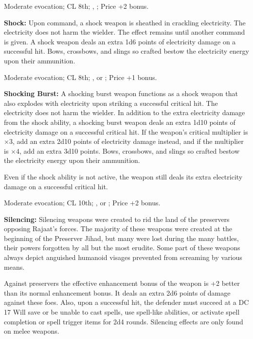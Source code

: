 Moderate evocation; CL 8th; , ; Price +2 bonus.

\textbf{Shock:} Upon command, a shock weapon is sheathed in crackling electricity. The electricity does not harm the wielder. The effect remains until another command is given. A shock weapon deals an extra 1d6 points of electricity damage on a successful hit. Bows, crossbows, and slings so crafted bestow the electricity energy upon their ammunition.

Moderate evocation; CL 8th; ,  or ; Price +1 bonus.

\textbf{Shocking Burst:} A shocking burst weapon functions as a shock weapon that also explodes with electricity upon striking a successful critical hit. The electricity does not harm the wielder. In addition to the extra electricity damage from the shock ability, a shocking burst weapon deals an extra 1d10 points of electricity damage on a successful critical hit. If the weapon's critical multiplier is $\times3$, add an extra 2d10 points of electricity damage instead, and if the multiplier is $\times4$, add an extra 3d10 points. Bows, crossbows, and slings so crafted bestow the electricity energy upon their ammunition.

Even if the shock ability is not active, the weapon still deals its extra electricity damage on a successful critical hit.

Moderate evocation; CL 10th; ,  or ; Price +2 bonus.

\textbf{Silencing:} Silencing weapons were created to rid the land of the preservers opposing Rajaat's forces. The majority of these weapons were created at the beginning of the Preserver Jihad, but many were lost during the many battles, their powers forgotten by all but the most erudite. Some part of these weapons always depict anguished humanoid visages prevented from screaming by various means.

Against preservers the effective enhancement bonus of the weapon is +2 better than its normal enhancement bonus. It deals an extra 2d6 points of damage against these foes. Also, upon a successful hit, the defender must succeed at a DC 17 Will save or be unable to cast spells, use spell-like abilities, or activate spell completion or spell trigger items for 2d4 rounds. Silencing effects are only found on melee weapons.


